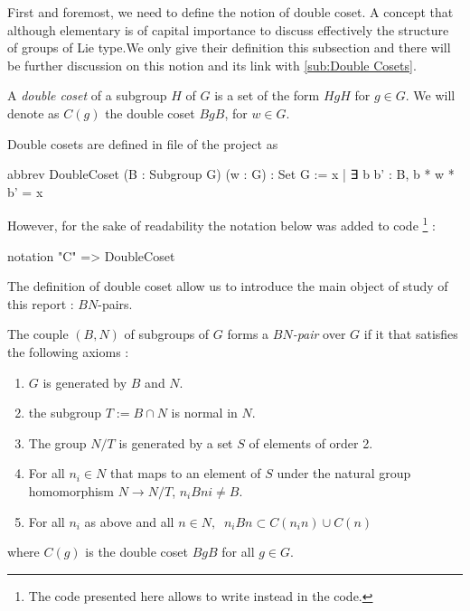 First and foremost, we need to define the notion of double coset. A concept that although elementary is of capital importance to discuss effectively the structure of groups of Lie type.We only give their definition this subsection and there will be further discussion on this notion and its link with \ref{sub:Double Cosets}.

\begin{definition} \label{def:DC}
    A \emph{double coset} of a subgroup $H$ of $G$ is a set of the form $HgH$ for $g \in G$. We  will denote as $C\left( g \right)$ the double coset $BgB$, for $w \in G$. \end{definition} 

    Double cosets are defined in  file of the project as
    \begin{leancode}
abbrev DoubleCoset (B : Subgroup G) (w : G) : Set G := 
    {x | ∃ b  b' : B, b * w * b' = x}
    \end{leancode} 
    However, for the sake of readability the notation below was added to code \footnote{The code presented here allows to write  instead  in the code.} :
\begin{leancode}
notation "C"  => DoubleCoset 
\end{leancode}

The definition of double coset allow us to introduce the main object of study of this report : $BN$-pairs.
\begin{definition}[$BN$-pair] \label{BN}
    The couple $\left( B,N \right)$ of subgroups of $G$ forms a \emph{$BN$-pair} over $G$ if it that satisfies the following axioms :
    \begin{enumerate}
        \item $G$ is generated by $B$ and $N$.
        \item the subgroup $T := B \cap N$ is normal in $N$.
        \item The group $N / T$ is generated by a set $S$ of elements of order 2.
        \item For all $n_{i} \in N$ that maps to an element of $S$ under the natural group homomorphism $N \to N / T$, $n_{i}Bni \neq B$.
        \item For all $n_{i}$ as above and all $n \in N, \ $ $n_i B n \subset C(n_in) \cup C(n)$
    \end{enumerate} where $C(g)$ is the double coset $BgB$ for all $g \in G$.
\end{definition}


